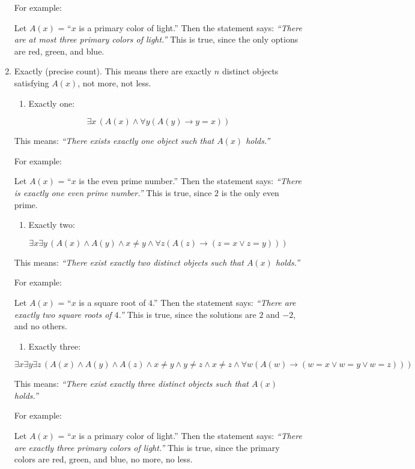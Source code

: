 \begin{enumerate}
  For example:

  Let \(A(x)\) = ``\(x\) is a primary color of light.'' Then the
  statement says: \emph{``There are at most three primary colors of
  light.''} This is true, since the only options are red, green, and
  blue.
\item
  Exactly (precise count). This means there are exactly \(n\) distinct
  objects satisfying \(A(x)\), not more, not less.

  \begin{enumerate}
  \def\labelenumii{\alph{enumii})}
  \tightlist
  \item
    Exactly one:
  \end{enumerate}

  \[
   \exists x \, (A(x) \land \forall y (A(y) \rightarrow y = x))
   \]

  This means: \emph{``There exists exactly one object such that \(A(x)\)
  holds.''}

  For example:

  Let \(A(x)\) = ``\(x\) is the even prime number.'' Then the statement
  says: \emph{``There is exactly one even prime number.''} This is true,
  since \(2\) is the only even prime.

  \begin{enumerate}
  \def\labelenumii{\alph{enumii})}
  \setcounter{enumii}{1}
  \tightlist
  \item
    Exactly two:
  \end{enumerate}

  \[
   \exists x \exists y \, (A(x) \land A(y) \land x \neq y \land \forall z (A(z) \rightarrow (z = x \lor z = y)))
   \]

  This means: \emph{``There exist exactly two distinct objects such that
  \(A(x)\) holds.''}

  For example:

  Let \(A(x)\) = ``\(x\) is a square root of \(4\).'' Then the statement
  says: \emph{``There are exactly two square roots of \(4\).''} This is
  true, since the solutions are \(2\) and \(-2\), and no others.

  \begin{enumerate}
  \def\labelenumii{\alph{enumii})}
  \setcounter{enumii}{2}
  \tightlist
  \item
    Exactly three:
  \end{enumerate}

  \[
   \exists x \exists y \exists z \, (A(x) \land A(y) \land A(z) \land x \neq y \land y \neq z \land x \neq z \land \forall w (A(w) \rightarrow (w = x \lor w = y \lor w = z)))
   \]

  This means: \emph{``There exist exactly three distinct objects such
  that \(A(x)\) holds.''}

  For example:

  Let \(A(x)\) = ``\(x\) is a primary color of light.'' Then the
  statement says: \emph{``There are exactly three primary colors of
  light.''} This is true, since the primary colors are red, green, and
  blue, no more, no less.
\end{enumerate}
